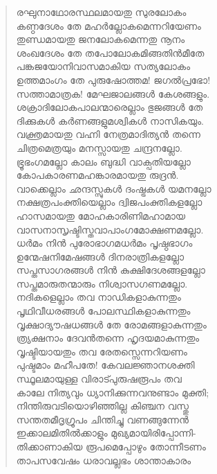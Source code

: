 \begin{verse}
രഘുനാഥോരസ്ഥലമായതു സുരലോകം\\
കണ്ഠദേശം തേ മഹര്‍ല്ലോകമെന്നറിയേണം\\
തുണ്ഡമായതു ജനലോകമെന്നതു നൂനം\\
ശംഖദേശം തേ തപോലോകമിങ്ങതിന്‍മീതേ\\
പങ്കജയോനിവാസമാകിയ സത്യലോകം\\
ഉത്തമാംഗം തേ പുരുഷോത്തമ! ജഗല്‍പ്രഭോ!\\
സത്താമാത്രക! മേഘജാലങ്ങള്‍ കേശങ്ങളും.\\
ശക്രാദിലോകപാലന്മാരെല്ലാം ഭുജങ്ങള്‍ തേ\\
ദിക്കുകള്‍ കര്‍ണങ്ങളുമശ്വികള്‍ നാസികയും.\\
വക്ത്രമായതു വഹ്നി നേത്രമാദിത്യന്‍ തന്നെ\\
ചിത്രമെത്രയും മനസ്സായതു ചന്ദ്രനല്ലോ.\\
ഭ്രൂഭംഗമല്ലോ കാലം ബുദ്ധി വാക്പതിയല്ലോ\\
കോപകാരണമഹങ്കാരമായതു രുദ്രന്‍.\\
വാക്കെല്ലാം ഛന്ദസ്സുകള്‍ ദംഷ്ട്രകള്‍ യമനല്ലോ\\
നക്ഷത്രപംക്തിയെല്ലാം ദ്വിജപംക്തികളല്ലോ\\
ഹാസമായതു മോഹകാരിണിമഹാമായ\\
വാസനാസൃഷ്ടിസ്തവാപാംഗമോക്ഷണമല്ലോ.\\
ധര്‍മം നിന്‍ പുരോഭാഗമധര്‍മം പൃഷ്ഠഭാഗം\\
ഉന്മേഷനിമേഷങ്ങള്‍ ദിനരാത്രികളല്ലോ\\
സപ്തസാഗരങ്ങള്‍ നിന്‍ കുക്ഷിദേശങ്ങളല്ലോ\\
സപ്തമാരുതന്മാരും നിശ്വാസഗണമല്ലോ.\\
നദികളെല്ലാം തവ നാഡികളാകുന്നതും\\
പൃഥിവീധരങ്ങള്‍ പോലസ്ഥികളാകുന്നതും\\
വൃക്ഷാദ്യൗഷധങ്ങള്‍ തേ രോമങ്ങളാകുന്നതും\\
ത്ര്യക്ഷനാം ദേവന്‍തന്നെ ഹൃദയമാകുന്നതും\\
വൃഷ്ടിയായതും തവ രേതസ്സെന്നറിയണം\\
പുഷ്ടമാം മഹീപതേ! കേവലജ്ഞാനശക്തി\\
സ്ഥൂലമായുള്ള വിരാട്പുരുഷരൂപം തവ\\
കാലേ നിത്യവും ധ്യാനിക്കുന്നവനുണ്ടാം മുക്തി;\\
നിന്തിരുവടിയൊഴിഞ്ഞില്ല കിഞ്ചന വസ്തു\\
സന്തതമീദൃഗ്രൂപം ചിന്തിച്ചു വണങ്ങുന്നേന്‍\\
ഇക്കാലമിതില്‍ക്കാളും മുഖ്യമായിരിപ്പോന്നി-\\
തിക്കാണാകിയ രൂപമെപ്പോഴും തോന്നീടണം\\
താപസവേഷം ധരാവല്ലഭം ശാന്താകാരം\\

\end{verse}
